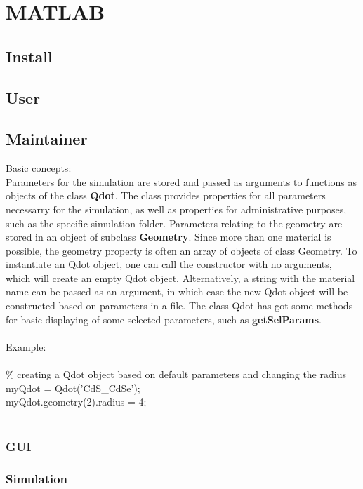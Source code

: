 \chapter{MATLAB}

\section{Install}
\section{User}
\section{Maintainer}

Basic concepts:
\\
Parameters for the simulation are stored and passed as arguments to functions as objects of the class \textbf{Qdot}. The class provides properties for all parameters necessarry for the simulation, as well as properties for administrative purposes, such as the specific simulation folder. Parameters relating to the geometry are stored in an object of subclass \textbf{Geometry}. Since more than one material is possible, the geometry property is often an array of objects of class Geometry. 
To instantiate an Qdot object, one can call the constructor with no arguments, which will create an empty Qdot object. Alternatively, a string with the material name can be passed as an argument, in which case the new Qdot object will be constructed based on parameters in a file.
The class Qdot has got some methods for basic displaying of some selected parameters, such as \textbf{getSelParams}.\\
\\
Example:\\\\
\% creating a Qdot object based on default parameters and changing the radius\\
myQdot = Qdot('CdS\_CdSe');\\
myQdot.geometry(2).radius = 4;\\
\\



\subsection{GUI}
\subsection{Simulation}

